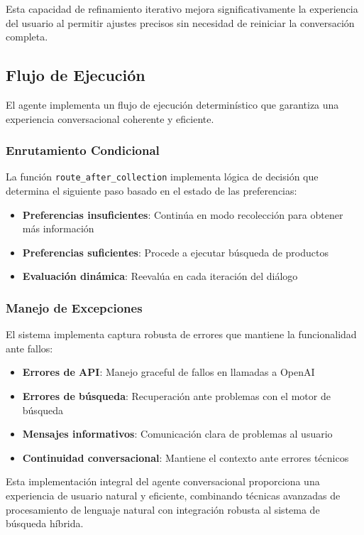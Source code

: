 Esta capacidad de refinamiento iterativo mejora significativamente la experiencia del usuario al permitir ajustes precisos sin necesidad de reiniciar la conversación completa.

\subsection{Flujo de Ejecución}

El agente implementa un flujo de ejecución determinístico que garantiza una experiencia conversacional coherente y eficiente.

\subsubsection{Enrutamiento Condicional}

La función \texttt{route\_after\_collection} implementa lógica de decisión que determina el siguiente paso basado en el estado de las preferencias:

\begin{itemize}
    \item \textbf{Preferencias insuficientes}: Continúa en modo recolección para obtener más información
    \item \textbf{Preferencias suficientes}: Procede a ejecutar búsqueda de productos
    \item \textbf{Evaluación dinámica}: Reevalúa en cada iteración del diálogo
\end{itemize}

\subsubsection{Manejo de Excepciones}

El sistema implementa captura robusta de errores que mantiene la funcionalidad ante fallos:

\begin{itemize}
    \item \textbf{Errores de API}: Manejo graceful de fallos en llamadas a OpenAI
    \item \textbf{Errores de búsqueda}: Recuperación ante problemas con el motor de búsqueda
    \item \textbf{Mensajes informativos}: Comunicación clara de problemas al usuario
    \item \textbf{Continuidad conversacional}: Mantiene el contexto ante errores técnicos
\end{itemize}

Esta implementación integral del agente conversacional proporciona una experiencia de usuario natural y eficiente, combinando técnicas avanzadas de procesamiento de lenguaje natural con integración robusta al sistema de búsqueda híbrida.
